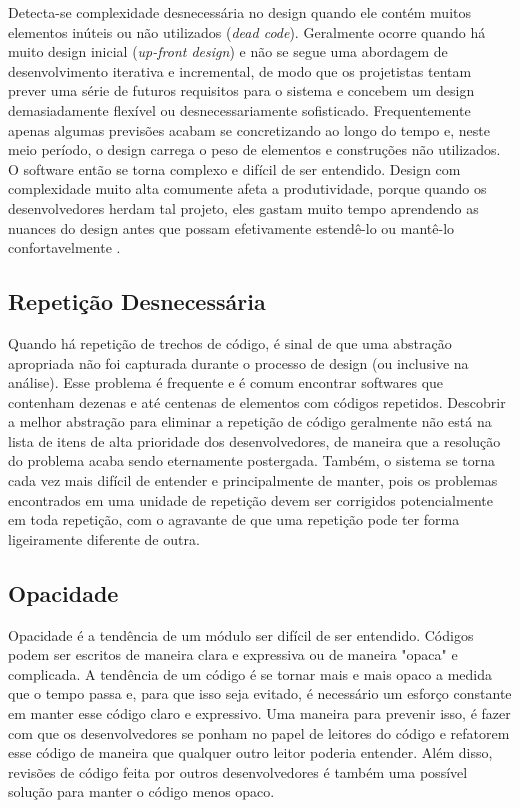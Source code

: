 Detecta-se complexidade desnecessária no design quando ele contém muitos elementos inúteis ou não utilizados (\textit{dead code}). Geralmente ocorre quando há muito design inicial (\textit{up-front design}) e não se segue uma abordagem de desenvolvimento iterativa e incremental, de modo que os projetistas tentam prever uma série de futuros requisitos para o sistema e concebem um design demasiadamente flexível ou desnecessariamente sofisticado. Frequentemente apenas algumas previsões acabam se concretizando ao longo do tempo e, neste meio período, o design carrega o peso de elementos e construções não utilizados. O software então se torna complexo e difícil de ser entendido. Design com complexidade muito alta comumente afeta a produtividade, porque quando os desenvolvedores herdam tal projeto, eles gastam muito tempo aprendendo as nuances do design antes que possam efetivamente estendê-lo ou mantê-lo confortavelmente \cite{kerievsky}.

\subsection{Repetição Desnecessária}

Quando há repetição de trechos de código, é sinal de que uma abstração apropriada não foi capturada durante o processo de design (ou inclusive na análise).
Esse problema é frequente e é comum encontrar softwares que contenham dezenas e até centenas de elementos com códigos repetidos. Descobrir a melhor abstração para eliminar a repetição de código geralmente não está na lista de itens de alta prioridade dos desenvolvedores, de maneira que a resolução do problema acaba sendo eternamente postergada. Também, o sistema se torna cada vez mais difícil de entender e principalmente de manter, pois os problemas encontrados em uma unidade de repetição devem ser corrigidos potencialmente em toda repetição, com o agravante de que uma repetição pode ter forma ligeiramente diferente de outra.

\subsection{Opacidade}

Opacidade é a tendência de um módulo ser difícil de ser entendido. Códigos podem ser escritos de maneira clara e expressiva ou de maneira "opaca" e complicada.
A tendência de um código é se tornar mais e mais opaco a medida que o tempo passa e, para que isso seja evitado, é necessário um esforço constante em 
manter esse código claro e expressivo. Uma maneira para prevenir isso, é fazer com que os desenvolvedores se ponham no papel de leitores do código e
refatorem esse código de maneira que qualquer outro leitor poderia entender. Além disso, revisões de código feita por outros desenvolvedores é também
uma possível solução para manter o código menos opaco.


